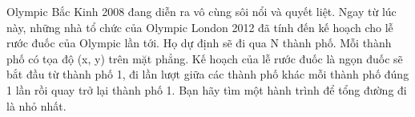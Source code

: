 Olympic Bắc Kinh 2008 đang diễn ra vô cùng sôi nổi và quyết liệt. Ngay từ lúc này, những nhà tổ chức của Olympic London 2012 đã tính đến kế hoạch cho lễ rước đuốc của Olympic lần tới. Họ dự định sẽ đi qua N thành phố. Mỗi thành phố có tọa độ (x, y) trên mặt phẳng. Kế hoạch của lễ rước đuốc là ngọn đuốc sẽ bắt đầu từ thành phố 1, đi lần lượt giữa các thành phố khác mỗi thành phố đúng 1 lần rồi quay trở lại thành phố 1. Bạn hãy tìm một hành trình để tổng đường đi là nhỏ nhất.